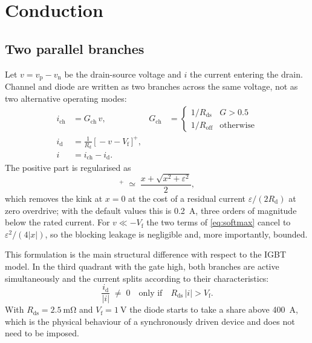 \documentclass[11pt,a4paper]{article}
\begin{document}
\section{Conduction}

\subsection{Two parallel branches}

Let $v = v_\mathrm{p} - v_\mathrm{n}$ be the drain-source voltage and $i$ the
current entering the drain. Channel and diode are written as two branches across
the same voltage, not as two alternative operating modes:
\begin{align}
  i_\mathrm{ch} &= G_\mathrm{ch}\,v,
  & G_\mathrm{ch} &=
  \begin{cases}
    1/R_\mathrm{ds} & G > 0.5\\[2pt]
    1/R_\mathrm{off}& \text{otherwise}
  \end{cases}
  \label{eq:chan}\\[4pt]
  i_\mathrm{d} &= \frac{1}{R_\mathrm{d}}\,
                  \big[\,-v - V_\mathrm{f}\,\big]^{+},
  \label{eq:diode}\\[4pt]
  i &= i_\mathrm{ch} - i_\mathrm{d}.
\end{align}
The positive part is regularised as
\begin{equation}
  [x]^{+} \;\simeq\; \frac{x + \sqrt{x^{2} + \varepsilon^{2}}}{2},
  \label{eq:softmax}
\end{equation}
which removes the kink at $x = 0$ at the cost of a residual current
$\varepsilon/(2R_\mathrm{d})$ at zero overdrive; with the default values this is
\SI{0.2}{\ampere}, three orders of magnitude below the rated current. For
$v \ll -V_\mathrm{f}$ the two terms of \eqref{eq:softmax} cancel to
$\varepsilon^{2}/(4|x|)$, so the blocking leakage is negligible and, more
importantly, bounded.

This formulation is the main structural difference with respect to the IGBT
model. In the third quadrant with the gate high, both branches are active
simultaneously and the current splits according to their characteristics:
\begin{equation}
  \frac{i_\mathrm{d}}{|i|} \;\ne\; 0
  \quad\text{only if}\quad
  R_\mathrm{ds}\,|i| > V_\mathrm{f}.
\end{equation}
With $R_\mathrm{ds} = \SI{2.5}{\milli\ohm}$ and $V_\mathrm{f} = \SI{1}{\volt}$
the diode starts to take a share above \SI{400}{\ampere}, which is the physical
behaviour of a synchronously driven device and does not need to be imposed.
\end{document}
